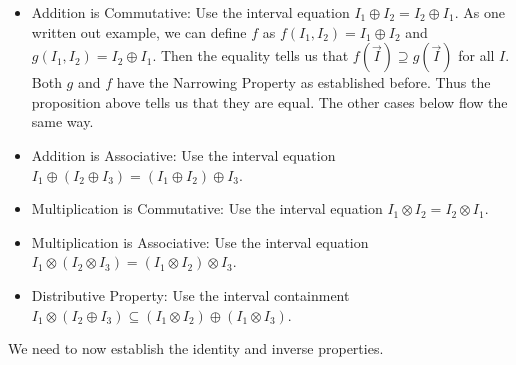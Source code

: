 \documentclass[12pt]{article}
\begin{document}
\begin{itemize}
    \item Addition is Commutative:  Use the interval equation $I_1 \oplus I_2 = I_2 \oplus I_1$. As one written out example, we can define $f$ as $f(I_1, I_2) = I_1 \oplus I_2$ and $g(I_1, I_2) = I_2 \oplus I_1$. Then the equality tells us that $f(\vec{I}) \supseteq g(\vec{I})$ for all $I$. Both $g$ and $f$ have the Narrowing Property as established before. Thus the proposition above tells us that they are equal. The other cases below flow the same way. 
    \item Addition is Associative: Use the interval equation $I_1 \oplus (I_2 \oplus I_3) = (I_1 \oplus I_2) \oplus I_3$.
    \item Multiplication is Commutative: Use the interval equation $I_1 \otimes I_2 = I_2 \otimes I_1$.
    \item Multiplication is Associative: Use the interval equation $I_1 \otimes (I_2 \otimes I_3) = (I_1 \otimes I_2) \otimes I_3$.
    \item Distributive Property: Use the interval containment $I_1 \otimes (I_2 \oplus I_3) \subseteq (I_1 \otimes I_2) \oplus (I_1 \otimes I_3)$.
\end{itemize}

We need to now establish the identity and inverse properties. 
\end{document}
